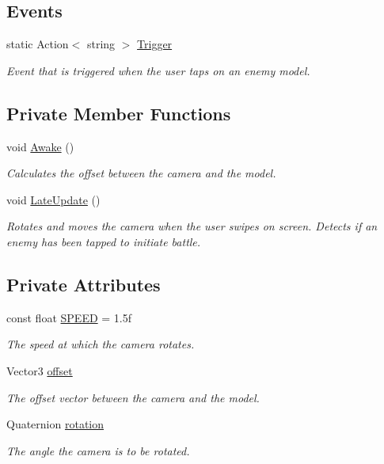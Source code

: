 \subsection*{Events}
\begin{DoxyCompactItemize}
\item 
static Action$<$ string $>$ \mbox{\hyperlink{class_camera_controller_ad2d7bdece6ed6b583da7cda47cb83097}{Trigger}}
\begin{DoxyCompactList}\small\item\em Event that is triggered when the user taps on an enemy model. \end{DoxyCompactList}\end{DoxyCompactItemize}
\subsection*{Private Member Functions}
\begin{DoxyCompactItemize}
\item 
void \mbox{\hyperlink{class_camera_controller_a266b0fde6845020de831bbd9bbcbc6a9}{Awake}} ()
\begin{DoxyCompactList}\small\item\em Calculates the offset between the camera and the model. \end{DoxyCompactList}\item 
void \mbox{\hyperlink{class_camera_controller_afcd241727886518c21b9609193e32d18}{Late\+Update}} ()
\begin{DoxyCompactList}\small\item\em Rotates and moves the camera when the user swipes on screen. Detects if an enemy has been tapped to initiate battle. \end{DoxyCompactList}\end{DoxyCompactItemize}
\subsection*{Private Attributes}
\begin{DoxyCompactItemize}
\item 
const float \mbox{\hyperlink{class_camera_controller_a8035ecea5e795b25f55bb1f727618535}{S\+P\+E\+ED}} = 1.\+5f
\begin{DoxyCompactList}\small\item\em The speed at which the camera rotates. \end{DoxyCompactList}\item 
Vector3 \mbox{\hyperlink{class_camera_controller_aff80d2275dae360196361c39078bfda4}{offset}}
\begin{DoxyCompactList}\small\item\em The offset vector between the camera and the model. \end{DoxyCompactList}\item 
Quaternion \mbox{\hyperlink{class_camera_controller_a785468828eec45dd16939c35cc5687a5}{rotation}}
\begin{DoxyCompactList}\small\item\em The angle the camera is to be rotated. \end{DoxyCompactList}\end{DoxyCompactItemize}


